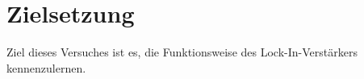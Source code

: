 \section{Zielsetzung}
\label{sec:Zielsetzung}
Ziel dieses Versuches ist es, die Funktionsweise des Lock-In-Verstärkers 
kennenzulernen.